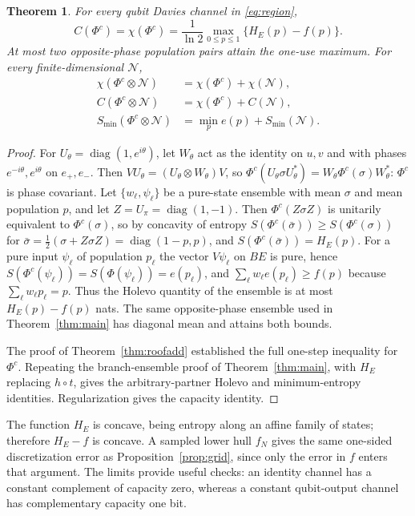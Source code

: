\documentclass[11pt]{article}
\newtheorem{theorem}{Theorem}
\newcommand{\Smin}{S_{\min}}
\begin{document}
\begin{theorem}\label{thm:complement}
For every qubit Davies channel in \eqref{eq:region},
\[
 C(\Phi^c)=\chi(\Phi^c)=
       \frac1{\ln2}\max_{0\le p\le1}\{H_E(p)-f(p)\}.
\]
At most two opposite-phase population pairs attain the one-use maximum.
For every finite-dimensional $\mathcal N$,
\begin{align*}
 \chi(\Phi^c\otimes\mathcal N)&=\chi(\Phi^c)+\chi(\mathcal N),\\
 C(\Phi^c\otimes\mathcal N)&=\chi(\Phi^c)+C(\mathcal N),\\
 \Smin(\Phi^c\otimes\mathcal N)&=\min_p e(p)+\Smin(\mathcal N).
\end{align*}
\end{theorem}
\begin{proof}
For $U_\theta=\operatorname{diag}(1,e^{i\theta})$, let $W_\theta$ act as the
identity on $u,v$ and with phases $e^{-i\theta},e^{i\theta}$ on $e_+,e_-$.
Then $VU_\theta=(U_\theta\otimes W_\theta)V$, so $\Phi^c(U_\theta\sigma U_\theta^*)=W_\theta\Phi^c(\sigma)W_\theta^*$:
$\Phi^c$ is phase covariant. Let $\{w_\ell,\psi_\ell\}$ be a pure-state ensemble with mean
$\sigma$ and mean population $p$, and let $Z=U_\pi=\operatorname{diag}(1,-1)$. Then
$\Phi^c(Z\sigma Z)$ is unitarily equivalent to $\Phi^c(\sigma)$, so
by concavity of entropy $S(\Phi^c(\bar\sigma))\ge S(\Phi^c(\sigma))$ for
$\bar\sigma=\tfrac12(\sigma+Z\sigma Z)=\operatorname{diag}(1-p,p)$, and
$S(\Phi^c(\bar\sigma))=H_E(p)$. For a pure input $\psi_\ell$ of population $p_\ell$ the vector
$V\psi_\ell$ on $BE$ is pure, hence $S(\Phi^c(\psi_\ell))=S(\Phi(\psi_\ell))=e(p_\ell)$, and
$\sum_\ell w_\ell e(p_\ell)\ge f(p)$ because $\sum_\ell w_\ell p_\ell=p$. Thus the Holevo
quantity of the ensemble is at most $H_E(p)-f(p)$ nats. The same opposite-phase
ensemble used in Theorem~\ref{thm:main} has diagonal mean and attains both bounds.

The proof of Theorem~\ref{thm:roofadd} established the full one-step inequality
for $\Phi^c$. Repeating the branch-ensemble proof of Theorem~\ref{thm:main},
with $H_E$ replacing $h\circ t$, gives the arbitrary-partner Holevo and
minimum-entropy identities. Regularization gives the capacity identity.
\end{proof}
The function $H_E$ is concave, being entropy along an affine family of states;
therefore $H_E-f$ is concave. A sampled lower hull $f_N$ gives the same
one-sided discretization error as Proposition~\ref{prop:grid}, since only
the error in $f$ enters that argument. The limits provide useful checks:
an identity channel has a constant complement of capacity zero, whereas a
constant qubit-output channel has complementary capacity one bit.
\end{document}
